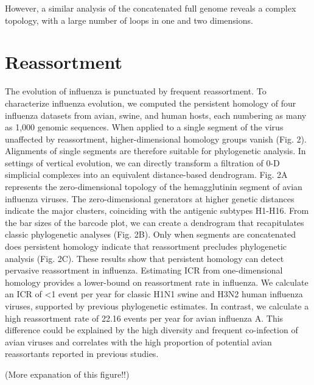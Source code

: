However, a similar analysis of the concatenated full genome reveals a complex topology, with a large number of loops in one and two dimensions.


\section{Reassortment}
\label{flu:reassortment}

The evolution of influenza is punctuated by frequent reassortment.
To characterize influenza evolution, we computed the persistent homology of four influenza datasets from avian, swine, and human hosts, each numbering as many as 1,000 genomic sequences.
When applied to a single segment of the virus unaffected by reassortment, higher-dimensional homology groups vanish (Fig. 2).
Alignments of single segments are therefore suitable for phylogenetic analysis.
In settings of vertical evolution, we can directly transform a filtration of 0-D simplicial complexes into an equivalent distance-based dendrogram.
Fig. 2A represents the zero-dimensional topology of the hemagglutinin segment of avian influenza viruses. 
The zero-dimensional generators at higher genetic distances indicate the major clusters, coinciding with the antigenic subtypes H1-H16.
From the bar sizes of the barcode plot, we can create a dendrogram that recapitulates classic phylogenetic analyses (Fig. 2B).
Only when segments are concatenated does persistent homology indicate that reassortment precludes phylogenetic analysis (Fig. 2C).
These results show that persistent homology can detect pervasive reassortment in influenza.
Estimating ICR from one-dimensional homology provides a lower-bound on reassortment rate in influenza.
We calculate an ICR of <1 event per year for classic H1N1 swine and H3N2 human influenza viruses, supported by previous phylogenetic estimates.
In contrast, we calculate a high reassortment rate of 22.16 events per year for avian influenza A.
This difference could be explained by the high diversity and frequent co-infection of avian viruses and correlates with the high proportion of potential avian reassortants reported in previous studies.

(More expanation of this figure!!)

